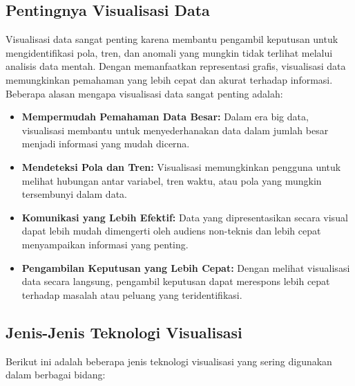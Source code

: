 \subsection{Pentingnya Visualisasi Data}
\label{subsec:pentingnya_visualisasi}

Visualisasi data sangat penting karena membantu pengambil keputusan untuk mengidentifikasi pola, tren, dan anomali yang mungkin tidak terlihat melalui analisis data mentah. Dengan memanfaatkan representasi grafis, visualisasi data memungkinkan pemahaman yang lebih cepat dan akurat terhadap informasi. Beberapa alasan mengapa visualisasi data sangat penting adalah:

\begin{itemize}
    \item \textbf{Mempermudah Pemahaman Data Besar:} Dalam era big data, visualisasi membantu untuk menyederhanakan data dalam jumlah besar menjadi informasi yang mudah dicerna.
    \item \textbf{Mendeteksi Pola dan Tren:} Visualisasi memungkinkan pengguna untuk melihat hubungan antar variabel, tren waktu, atau pola yang mungkin tersembunyi dalam data.
    \item \textbf{Komunikasi yang Lebih Efektif:} Data yang dipresentasikan secara visual dapat lebih mudah dimengerti oleh audiens non-teknis dan lebih cepat menyampaikan informasi yang penting.
    \item \textbf{Pengambilan Keputusan yang Lebih Cepat:} Dengan melihat visualisasi data secara langsung, pengambil keputusan dapat merespons lebih cepat terhadap masalah atau peluang yang teridentifikasi.
\end{itemize}

\subsection{Jenis-Jenis Teknologi Visualisasi}
\label{subsec:jenis_jenis_visualisasi}

Berikut ini adalah beberapa jenis teknologi visualisasi yang sering digunakan dalam berbagai bidang:

